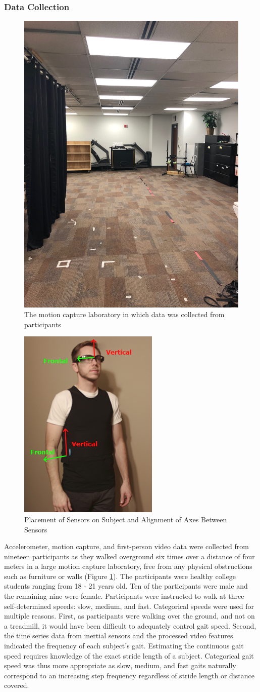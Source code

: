 \documentclass[12pt]{report}
\begin{document}
\subsubsection{Data Collection}

\begin{figure}[!t]
\centering
\includegraphics[width=1.8 in]{figure/MoCapRoom}
\caption{The motion capture laboratory in which data was collected from participants}
\label{fig_mocap}
\end{figure}

\begin{figure}[!t]
\centering
\includegraphics[width=1.8 in]{figure/sensorAlign}
\caption{Placement of Sensors on Subject and Alignment of Axes Between Sensors}
\label{fig_axes}
\end{figure}

Accelerometer, motion capture, and first-person video data were collected from nineteen participants as they walked overground six times over a distance of four meters in a large motion capture laboratory, free from any physical obstructions such as furniture or walls (Figure \ref{fig_mocap}). The participants were healthy college students ranging from 18 - 21 years old. Ten of the participants were male and the remaining nine were female. Participants were instructed to walk at three self-determined speeds: slow, medium, and fast. Categorical speeds were used for multiple reasons. First, as participants were walking over the ground, and not on a treadmill, it would have been difficult to adequately control gait speed. Second, the time series data from inertial sensors and the processed video features indicated the frequency of each subject's gait. Estimating the continuous gait speed requires knowledge of the exact stride length of a subject. Categorical gait speed was thus more appropriate as slow, medium, and fast gaits naturally correspond to an increasing step frequency regardless of stride length or distance covered.
\end{document}
